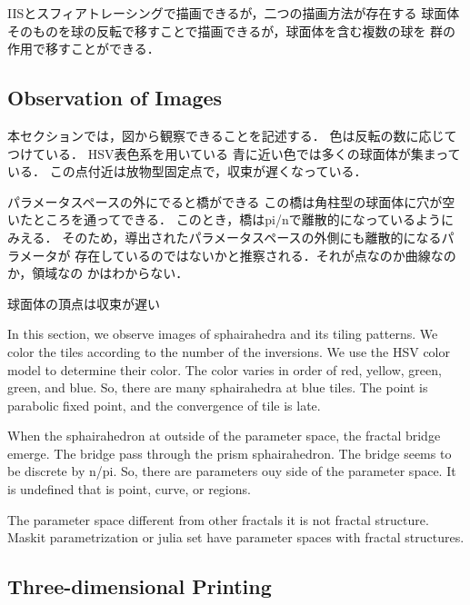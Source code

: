 \documentclass[dvipdfmx]{interact}
\theoremstyle{plain}%
\theoremstyle{definition}
\theoremstyle{remark}
\theoremstyle{problemstyle}
\begin{document}
IISとスフィアトレーシングで描画できるが，二つの描画方法が存在する
球面体そのものを球の反転で移すことで描画できるが，球面体を含む複数の球を
群の作用で移すことができる．

\subsection{Observation of Images}

本セクションでは，図から観察できることを記述する．
色は反転の数に応じてつけている．
HSV表色系を用いている
青に近い色では多くの球面体が集まっている．
この点付近は放物型固定点で，収束が遅くなっている．

パラメータスペースの外にでると橋ができる
この橋は角柱型の球面体に穴が空いたところを通ってできる．
このとき，橋はpi/nで離散的になっているようにみえる．
そのため，導出されたパラメータスペースの外側にも離散的になるパラメータが
存在しているのではないかと推察される．それが点なのか曲線なのか，領域なの
かはわからない．

球面体の頂点は収束が遅い

In this section, we observe images of sphairahedra and its tiling
patterns.
We color the tiles according to the number of the inversions.
We use the HSV color model to determine their color.
The color varies in order of red, yellow, green, green, and blue.
So, there are many sphairahedra at blue tiles.
The point is parabolic fixed point, and the convergence of tile is
late.

When the sphairahedron at outside of the parameter space,
the fractal bridge emerge.
The bridge pass through the prism sphairahedron.
The bridge seems to be discrete by n/pi.
So, there are parameters ouy side of the parameter space.
It is undefined that is point, curve, or regions.



The parameter space different from other fractals it is not fractal
structure. Maskit parametrization or julia set have parameter spaces
with fractal structures.

\subsection{Three-dimensional Printing}
\end{document}
